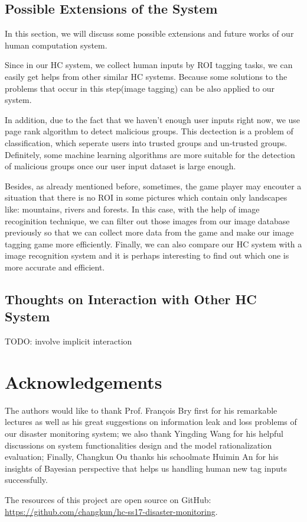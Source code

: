 \subsection{Possible Extensions of the System}
In this section, we will discuss some possible extensions and future works of our human computation system. 

Since in our HC system, we collect human inputs by ROI tagging tasks, we can easily get helps from other similar HC systems. Because some solutions to the problems that occur in this step(image tagging) can be also applied to our system.

In addition, due to the fact that we haven't enough user inputs right now, we use page rank algorithm to detect malicious groups. This dectection is a problem of classification, which seperate users into trusted groups and un-trusted groups. Definitely, some machine learning algorithms are more suitable for the detection of malicious groups once our user input dataset is large enough.

Besides, as already mentioned before, sometimes, the game player may encouter a situation that there is no ROI in some pictures which contain only landscapes like: mountains, rivers and forests. In this case, with the help of image recoginition technique, we can filter out those images from our image database previously so that we can collect more data from the game and make our image tagging game more efficiently. Finally, we can also compare our HC system with a image recognition system and it is perhaps interesting to find out which one is more accurate and efficient.

\subsection{Thoughts on Interaction with Other HC System}

TODO: involve implicit interaction

\section*{Acknowledgements}
The authors would like to thank Prof. Fran\c{c}ois Bry first for his remarkable lectures as well as
his great suggestions on information leak and loss problems of our disaster monitoring system;
we also thank Yingding Wang for his helpful discussions on system functionalities design 
and the model rationalization evaluation;
Finally, Changkun Ou thanks his schoolmate Huimin An for his insights of Bayesian perspective that
helps us handling human new tag inputs successfully.

The resources of this project are open source on GitHub: \\
\url{https://github.com/changkun/hc-ss17-disaster-monitoring}.